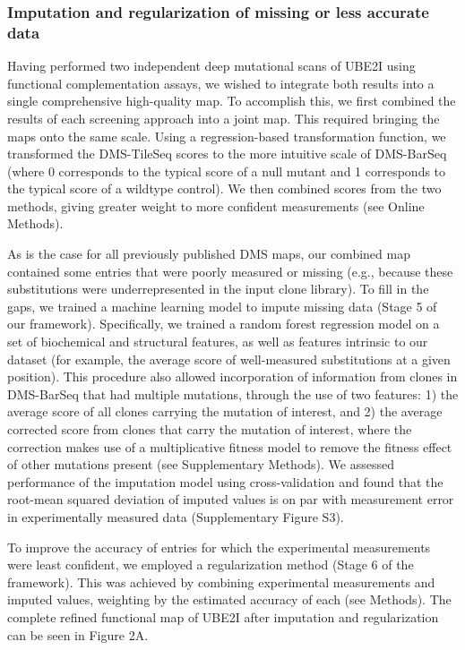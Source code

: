 \subsubsection{Imputation and regularization of missing or less accurate data}

Having performed two independent deep mutational scans of UBE2I using functional complementation assays, we wished to integrate both results into a single comprehensive high-quality map. To accomplish this, we first combined the results of each screening approach into a joint map.  This required bringing the maps onto the same scale. Using a regression-based transformation function, we transformed the DMS-TileSeq scores to the more intuitive scale of DMS-BarSeq (where 0 corresponds to the typical score of a null mutant and 1 corresponds to the typical score of a wildtype control). We then combined scores from the two methods, giving greater weight to more confident measurements (see Online Methods).

As is the case for all previously published DMS maps, our combined map contained some entries that were poorly measured or missing (e.g., because these substitutions were underrepresented in the input clone library). To fill in the gaps, we trained a machine learning model to impute missing data (Stage 5 of our framework). Specifically, we trained a random forest regression model on a set of biochemical and structural features, as well as features intrinsic to our dataset (for example, the average score of well-measured substitutions at a given position). This procedure also allowed incorporation of information from clones in DMS-BarSeq that had multiple mutations, through the use of two features: 1) the average score of all clones carrying the mutation of interest, and 2) the average corrected score from clones that carry the mutation of interest, where the correction makes use of a multiplicative fitness model to remove the fitness effect of other mutations present (see Supplementary Methods). We assessed performance of the imputation model using cross-validation and found that the root-mean squared deviation of imputed values is on par with measurement error in experimentally measured data (Supplementary Figure S3).

To improve the accuracy of entries for which the experimental measurements were least confident, we employed a regularization method (Stage 6 of the framework).  This was achieved by combining experimental measurements and imputed values, weighting by the estimated accuracy of each (see Methods). The complete refined functional map of UBE2I after imputation and regularization can be seen in Figure 2A. 

